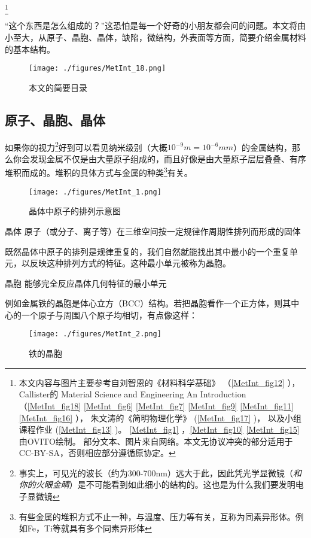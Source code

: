
\footnote{本文内容与图片主要参考自刘智恩的《材料科学基础》
（\autoref{MetInt_fig12} ），
Callister的 Material Science and Engineering An Introduction
（\autoref{MetInt_fig18} \autoref{MetInt_fig6} \autoref{MetInt_fig7} \autoref{MetInt_fig9} \autoref{MetInt_fig11} \autoref{MetInt_fig16} ），
朱文涛的《简明物理化学》
(\autoref{MetInt_fig17} )，
以及小组课程作业
(\autoref{MetInt_fig13} )。 
\autoref{MetInt_fig1} ，\autoref{MetInt_fig10} \autoref{MetInt_fig15} 由OVITO绘制。
部分文本、图片来自网络。本文无协议冲突的部分适用于CC-BY-SA，否则相应部分遵循原协定。}

“这个东西是怎么组成的？”这恐怕是每一个好奇的小朋友都会问的问题。本文将由小至大，从原子、晶胞、晶体，缺陷，微结构，外表面等方面，简要介绍金属材料的基本结构。
\begin{figure}[ht]
\centering
\texttt{[image: ./figures/MetInt\_18.png]}
\caption{本文的简要目录} \label{MetInt_fig18}
\end{figure}

\subsection{原子、晶胞、晶体}
如果你的视力\footnote{事实上，可见光的波长（约为300-700nm）远大于此，因此凭光学显微镜（\textsl{和你的火眼金睛}）是不可能看到如此细小的结构的。这也是为什么我们要发明电子显微镜}好到可以看见纳米级别（大概$10^{-9}m =10^{-6} mm$）的金属结构，那么你会发现金属不仅是由大量原子组成的，而且好像是由大量原子层层叠叠、有序堆积而成的。堆积的具体方式与金属的种类\footnote{有些金属的堆积方式不止一种，与温度、压力等有关，互称为同素异形体。例如Fe，Ti等就具有多个同素异形体}有关。

\begin{figure}[ht]
\centering
\texttt{[image: ./figures/MetInt\_1.png]}
\caption{晶体中原子的排列示意图} \label{MetInt_fig1}
\end{figure}

\begin{definition}{晶体}
原子（或分子、离子等）在三维空间按一定规律作周期性排列而形成的固体
\end{definition}

既然晶体中原子的排列是规律重复的，我们自然就能找出其中最小的一个重复单元，以反映这种排列方式的特征。这种最小单元被称为晶胞。
\begin{definition}{晶胞}
能够完全反应晶体几何特征的最小单元
\end{definition}
例如金属铁的晶胞是体心立方（BCC）结构。若把晶胞看作一个正方体，则其中心的一个原子与周围八个原子均相切，有点像这样：
\begin{figure}[ht]
\centering
\texttt{[image: ./figures/MetInt\_2.png]}
\caption{铁的晶胞} \label{MetInt_fig2}
\end{figure}

